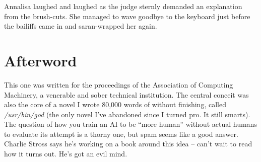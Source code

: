 
Annalisa laughed and laughed as the judge sternly demanded an 
explanation from the brush-cuts. She managed to wave goodbye to the 
keyboard just before the bailiffs came in and saran-wrapped her again.

\section{Afterword}

This one was written for the proceedings of the Association of 
Computing Machinery, a venerable and sober technical institution. The 
central conceit was also the core of a novel I wrote 80,000 words of 
without finishing, called \emph{/\-usr/\-bin/\-god} (the only novel 
I've abandoned since I turned pro. It still smarts). The question of 
how you train an AI to be “more human” without actual humans to 
evaluate its attempt is a thorny one, but spam seems like a good 
answer. Charlie Stross says he's working on a book around this idea -- 
can't wait to read how it turns out. He's got an evil mind.

